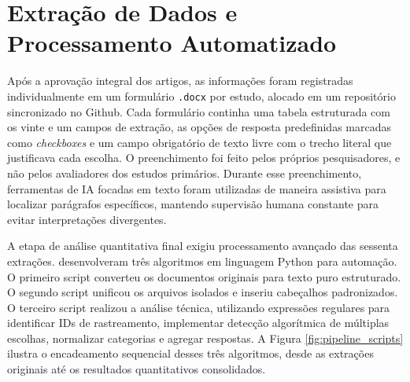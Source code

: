 \section{Extração de Dados e Processamento Automatizado}

Após a aprovação integral dos artigos, as informações foram registradas individualmente em um formulário \texttt{.docx} por estudo, alocado em um repositório sincronizado no Github. Cada formulário continha uma tabela estruturada com os vinte e um campos de extração, as opções de resposta predefinidas marcadas como \textit{checkboxes} e um campo obrigatório de texto livre com o trecho literal que justificava cada escolha. O preenchimento foi feito pelos próprios pesquisadores, e não pelos avaliadores dos estudos primários. Durante esse preenchimento, ferramentas de IA focadas em texto foram utilizadas de maneira assistiva para localizar parágrafos específicos, mantendo supervisão humana constante para evitar interpretações divergentes.

A etapa de análise quantitativa final exigiu processamento avançado das sessenta extrações. \citet{RothAleo2026} desenvolveram três algoritmos em linguagem Python para automação. O primeiro script converteu os documentos originais para texto puro estruturado. O segundo script unificou os arquivos isolados e inseriu cabeçalhos padronizados. O terceiro script realizou a análise técnica, utilizando expressões regulares para identificar IDs de rastreamento, implementar detecção algorítmica de múltiplas escolhas, normalizar categorias e agregar respostas. A Figura \ref{fig:pipeline_scripts} ilustra o encadeamento sequencial desses três algoritmos, desde as extrações originais até os resultados quantitativos consolidados.

